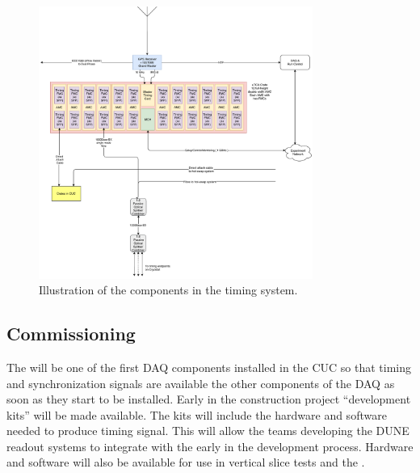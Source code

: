 \documentclass{article}
\begin{document}

\begin{figure}[H]
  \includegraphics[width=0.8\textwidth]{DUNE_SP_Timing_1nov18.pdf}
  \caption{Illustration of the components in the \single timing system.}
  \label{fig:daq-readout-sp-timing}
\end{figure}

\subsection{Commissioning}

The  will be one of the first DAQ components installed in the CUC so that timing and synchronization signals are available the other components of the DAQ as soon as they start to be installed. Early in the construction project  ``development kits'' will be made available. The kits will include the hardware and software needed to produce  timing signal. This will allow the teams developing the DUNE readout systems to integrate with the  early in the development process. Hardware and software will also be available for use in vertical slice tests and the . 
\end{document}
